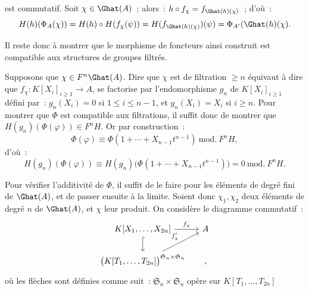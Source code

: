 est
commutatif. Soit \(\chi\in\Ghat(A)\)~; alors~: \(h\circ f_\chi=f_{\Ghat(h)(\chi)}\)~; d'où~:
\[
  H(h)(\Phi_A(\chi))=H(h)\circ H(f_\chi(\psi))
  =H(f_{\Ghat(h)(\chi)})(\psi)=\Phi_{A'}(\Ghat(h)(\chi).
\]

Il reste donc à montrer que le morphisme de foncteurs ainsi construit est compatible aux structures de groupes filtrés.

Supposons que \(\chi\in F^n\Ghat(A)\). Dire que \(\chi\) est de filtration \(\geq n\) équivaut à dire que \(f_\chi:K[X_i]_{i\geq 1}\to A\), se factorise par l'endomorphisme \(g_n\) de \(K[X_i]_{i\geq 1}\) défini par~: \(g_n(X_i)=0\) si \(1\leq i\leq n-1\), et \(g_n(X_i)=X_i\) si \(i\geq n\).
Pour montrer que \(\Phi\) est compatible aux filtrations, il suffit donc de montrer que \(H(g_n)(\Phi(\varphi))\in F^nH\). Or par construction~:
\[
  \Phi(\varphi)\equiv \Phi(1+\cdots+X_{n-1}t^{n-1})\ \mathrm{mod.}\ F^nH,
\]
d'où~:
\[
  H(g_n)(\Phi(\varphi))
  \equiv H(g_n)\bigl(\Phi(1+\cdots+X_{n-1}t^{n-1})\bigr)
  =0\ \mathrm{mod.}\ F^nH.
\]

Pour vérifier l'additivité de \(\Phi\), il suffit de le faire pour les éléments de degré fini de \(\Ghat(A)\), et de passer ensuite à la limite. Soient donc \(\chi_1,\chi_2\) deux éléments de degré \(n\) de \(\Ghat(A)\), et \(\chi\) leur produit. On considère le diagramme commutatif~:
\[
\begin{tikzcd}[column sep=tiny]
K[X_1,\ldots,X_{2n}] \arrow[rr,"f_\chi"] \arrow[d,hook] && A\\
\bigl(K[T_1,\ldots,T_{2n}]\bigr)^{\mathfrak S_n\times\mathfrak S_n}
\arrow[urr,"f'_\chi"] && ,
\end{tikzcd}
\]
où les flèches sont définies comme suit~: \(\mathfrak S_n\times\mathfrak S_n\) opère sur \(K[T_1,\ldots,T_{2n}]\) 
